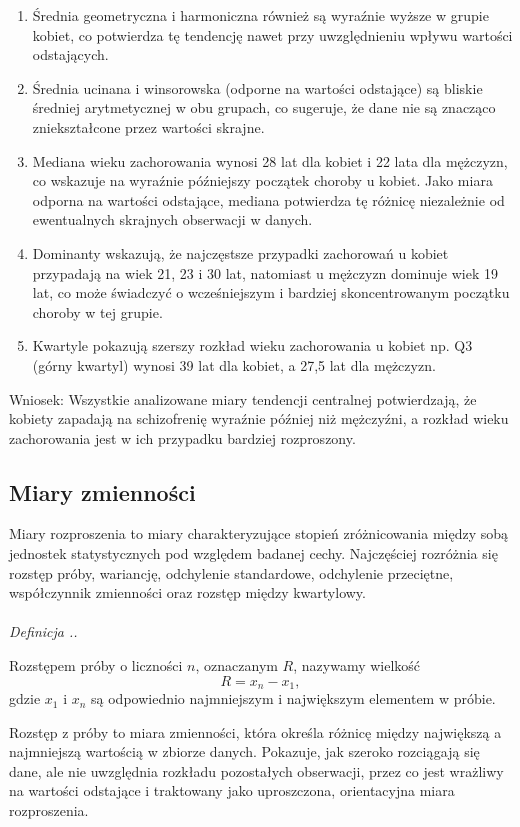 \documentclass{mwart}
\newenvironment{defi}[1][]{
	\refstepcounter{definition}%
	\noindent\textit{Definicja \thesection.\thedefinition. #1}\par\nopagebreak\vspace{0.5em}\normalfont
}{\par\vspace{1em}}
\begin{document}
	\begin{enumerate}
		\item Średnia geometryczna i harmoniczna również są wyraźnie wyższe w grupie kobiet, co potwierdza tę tendencję nawet przy uwzględnieniu wpływu wartości odstających.
		\item Średnia ucinana i winsorowska (odporne na wartości odstające) są bliskie średniej arytmetycznej w obu grupach, co sugeruje, że dane nie są znacząco zniekształcone przez wartości skrajne.
		\item Mediana wieku zachorowania wynosi 28 lat dla kobiet i 22 lata dla mężczyzn, co wskazuje na wyraźnie późniejszy początek choroby u kobiet. Jako miara odporna na wartości odstające, mediana potwierdza tę różnicę niezależnie od ewentualnych skrajnych obserwacji w danych.
		\item Dominanty wskazują, że najczęstsze przypadki zachorowań u kobiet przypadają na wiek 21, 23 i 30 lat, natomiast u mężczyzn dominuje wiek 19 lat, co może świadczyć o wcześniejszym i bardziej skoncentrowanym początku choroby w tej grupie.
		\item Kwartyle pokazują szerszy rozkład wieku zachorowania u kobiet np. Q3 (górny kwartyl) wynosi 39 lat dla kobiet, a 27,5 lat dla mężczyzn.
	\end{enumerate}
	Wniosek: Wszystkie analizowane miary tendencji centralnej potwierdzają, że kobiety zapadają na schizofrenię wyraźnie później niż mężczyźni, a rozkład wieku zachorowania jest w ich przypadku bardziej rozproszony.
	\subsection{Miary zmienności}
	\noindent
	Miary rozproszenia to miary charakteryzujące stopień zróżnicowania między sobą jednostek statystycznych pod względem badanej cechy. Najczęściej rozróżnia się rozstęp próby, wariancję, odchylenie standardowe, odchylenie przeciętne, współczynnik zmienności oraz rozstęp między kwartylowy.\\\\
	\begin{defi}
		Rozstępem próby o liczności $n$, oznaczanym $R$, nazywamy wielkość
		$$R=x_n-x_1,$$
		gdzie $x_1$ i $x_n$ są odpowiednio najmniejszym i największym elementem w próbie.
	\end{defi}
	\noindent
	Rozstęp z próby to miara zmienności, która określa różnicę między największą a najmniejszą wartością w zbiorze danych. Pokazuje, jak szeroko rozciągają się dane, ale nie uwzględnia rozkładu pozostałych obserwacji, przez co jest wrażliwy na wartości odstające i traktowany jako uproszczona, orientacyjna miara rozproszenia.
	
\end{document}
